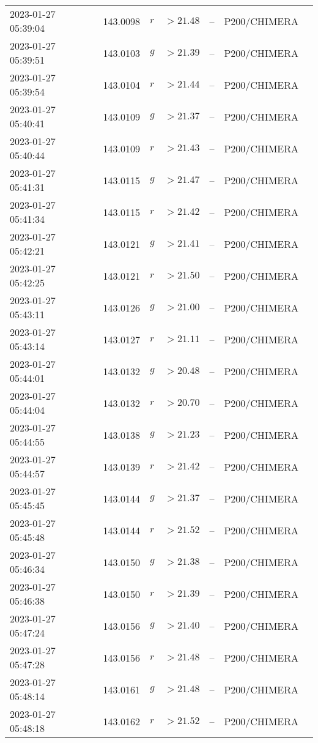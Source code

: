 \documentclass{nature_plusfigure}
\begin{document}
\begin{supplement}
\begin{center}
\begin{longtable}{lllllll}
2023-01-27 05:39:04 & 143.0098 & $r$ & $>21.48$ & -- & P200/CHIMERA &  \\ 
2023-01-27 05:39:51 & 143.0103 & $g$ & $>21.39$ & -- & P200/CHIMERA &  \\ 
2023-01-27 05:39:54 & 143.0104 & $r$ & $>21.44$ & -- & P200/CHIMERA &  \\ 
2023-01-27 05:40:41 & 143.0109 & $g$ & $>21.37$ & -- & P200/CHIMERA &  \\ 
2023-01-27 05:40:44 & 143.0109 & $r$ & $>21.43$ & -- & P200/CHIMERA &  \\ 
2023-01-27 05:41:31 & 143.0115 & $g$ & $>21.47$ & -- & P200/CHIMERA &  \\ 
2023-01-27 05:41:34 & 143.0115 & $r$ & $>21.42$ & -- & P200/CHIMERA &  \\ 
2023-01-27 05:42:21 & 143.0121 & $g$ & $>21.41$ & -- & P200/CHIMERA &  \\ 
2023-01-27 05:42:25 & 143.0121 & $r$ & $>21.50$ & -- & P200/CHIMERA &  \\ 
2023-01-27 05:43:11 & 143.0126 & $g$ & $>21.00$ & -- & P200/CHIMERA &  \\ 
2023-01-27 05:43:14 & 143.0127 & $r$ & $>21.11$ & -- & P200/CHIMERA &  \\ 
2023-01-27 05:44:01 & 143.0132 & $g$ & $>20.48$ & -- & P200/CHIMERA &  \\ 
2023-01-27 05:44:04 & 143.0132 & $r$ & $>20.70$ & -- & P200/CHIMERA &  \\ 
2023-01-27 05:44:55 & 143.0138 & $g$ & $>21.23$ & -- & P200/CHIMERA &  \\ 
2023-01-27 05:44:57 & 143.0139 & $r$ & $>21.42$ & -- & P200/CHIMERA &  \\ 
2023-01-27 05:45:45 & 143.0144 & $g$ & $>21.37$ & -- & P200/CHIMERA &  \\ 
2023-01-27 05:45:48 & 143.0144 & $r$ & $>21.52$ & -- & P200/CHIMERA &  \\ 
2023-01-27 05:46:34 & 143.0150 & $g$ & $>21.38$ & -- & P200/CHIMERA &  \\ 
2023-01-27 05:46:38 & 143.0150 & $r$ & $>21.39$ & -- & P200/CHIMERA &  \\ 
2023-01-27 05:47:24 & 143.0156 & $g$ & $>21.40$ & -- & P200/CHIMERA &  \\ 
2023-01-27 05:47:28 & 143.0156 & $r$ & $>21.48$ & -- & P200/CHIMERA &  \\ 
2023-01-27 05:48:14 & 143.0161 & $g$ & $>21.48$ & -- & P200/CHIMERA &  \\ 
2023-01-27 05:48:18 & 143.0162 & $r$ & $>21.52$ & -- & P200/CHIMERA &  \\ 

\end{longtable}
\end{center}
\end{supplement}
\end{document}
